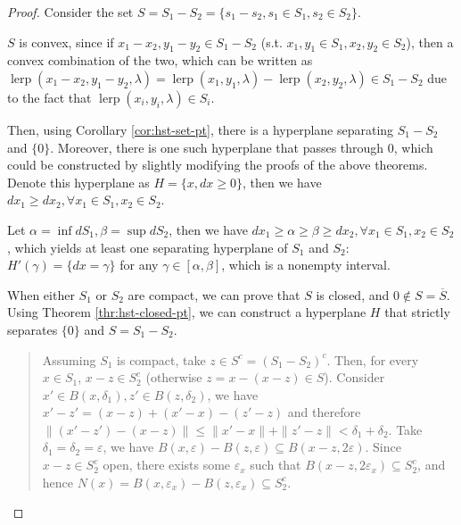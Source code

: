 \begin{proof}
  Consider the set \( S = S_{1} - S_{2} = \{s_{1} - s_{2},
  s_{1} \in S_{1}, s_{2} \in S_{2}\}   \).

  \( S \) is convex, since if \( x_{1}-x_{2}, y_{1}-y_{2} \in S_{1}-S_{2} \)
  (s.t. \( x_{1},y_{1} \in S_{1}, x_{2}, y_{2} \in S_{2} \)), then a convex
  combination of the two, which can be written as \(
  \operatorname{lerp}(x_{1}-x_{2},y_{1}-y_{2},\lambda) =
  \operatorname{lerp}(x_{1},y_{1},\lambda) -
  \operatorname{lerp}(x_{2},y_{2},\lambda) \in S_{1}-S_{2} \) due to the fact
  that \( \operatorname{lerp}(x_{i},y_{i}, \lambda) \in S_{i} \).

  Then, using Corollary \ref{cor:hst-set-pt}, there is a hyperplane separating
  \( S_{1}-S_{2} \) and \( \{0\}   \). Moreover, there is one such hyperplane
  that passes through \( 0 \), which could be constructed by slightly modifying
  the proofs of the above theorems. Denote this hyperplane as \( H = \{x, dx \ge
  0\}   \), then we have \( dx_{1} \ge  dx_{2}, \forall x_{1} \in S_{1}, x_{2}
  \in S_{2} \).

  Let \( \alpha = \inf dS_{1}, \beta = \sup dS_{2} \), then we have \( dx_{1}
  \ge  \alpha \ge  \beta \ge dx_{2}, \forall x_{1} \in S_{1},x_{2} \in S_{2} \),
  which yields at least one separating hyperplane of \( S_{1} \) and \( S_{2}
  \): \( H'(\gamma) = \{ dx = \gamma\}   \) for any \( \gamma \in [\alpha,\beta]
  \), which is a nonempty interval.

  When either \( S_{1} \) or \( S_{2} \) are compact, we can prove that \( S \)
  is closed, and \( 0 \notin S = \overline{S} \). Using Theorem
  \ref{thr:hst-closed-pt}, we can construct a hyperplane \( H \) that strictly
  separates \( \{0\}   \) and \( S = S_{1} - S_{2} \).

  \begin{quote}
    Assuming \( S_{1} \) is compact, take \( z \in S^{c} = (S_{1} - S_{2})^{c}
    \). Then, for every \( x \in S_{1} \), \( x - z \in S_{2}^{c} \) (otherwise
    \( z = x - (x - z) \in S \)). Consider \( x' \in B(x, \delta_{1}), z' \in
    B(z, \delta_{2}) \), we have \( x' - z' = (x - z) + (x' - x) - (z' - z) \)
    and therefore \( \|(x' - z') - (x - z)\| \le \|x' - x\| + \|z' - z\| <
    \delta_{1} + \delta_{2} \). Take \( \delta_{1} = \delta_{2} =
    \varepsilon\), we have \( B \left( x, \varepsilon
    \right) - B(z, \varepsilon) \subseteq B(x - z, 2\varepsilon) \).
    Since \( x - z \in S_{2}^{c} \) open, there exists some \( \varepsilon_{x}
    \) such that \( B(x - z, 2\varepsilon_{x}) \subseteq S_{2}^{c} \), and hence
    \( N(x) = B \left( x, \varepsilon_{x} \right)  - B \left( z,
    \varepsilon_{x} \right) \subseteq S_{2}^{c} \).


\end{quote}
\end{proof}
